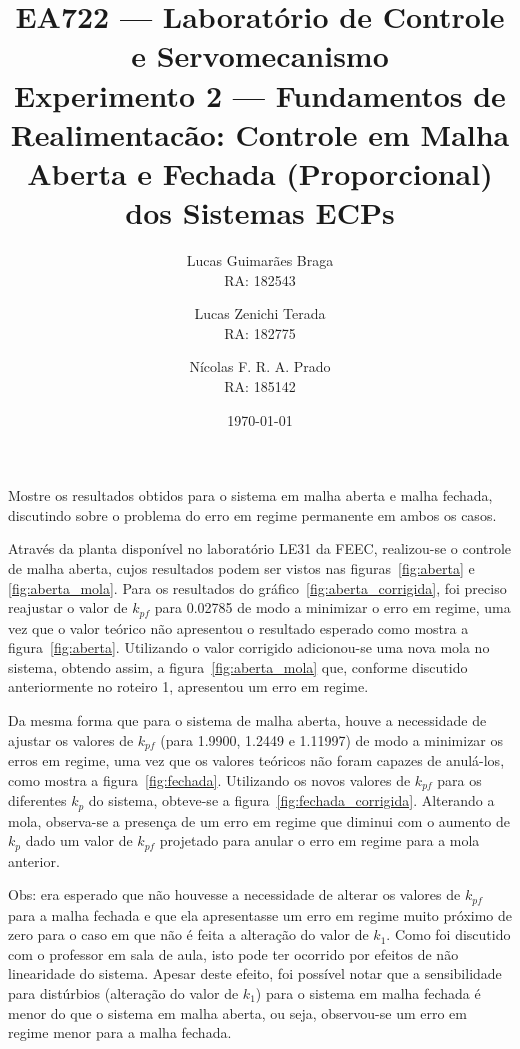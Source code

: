 \documentclass{ZenTera}
\title{\textbf{EA722 --- Laboratório de Controle e Servomecanismo\vspace{7mm}\\\large Experimento 2 --- Fundamentos de Realimentacão: Controle em Malha Aberta e Fechada (Proporcional) dos Sistemas ECPs} }
\author{Lucas Guimarães Braga \\RA: 182543 \and Lucas Zenichi Terada \\RA: 182775 \and Nícolas F. R. A. Prado \\RA: 185142}
\date{\today}
\begin{document}
%
\maketitle 

\begin{questions}
\question Mostre os resultados obtidos para o sistema em malha aberta e malha fechada, discutindo sobre o problema do erro em regime permanente em ambos os casos.

    \begin{solution}
        Através da planta disponível no laboratório LE31 da FEEC, realizou-se o controle de malha aberta, cujos resultados podem ser vistos nas figuras~\ref{fig:aberta} e \ref{fig:aberta_mola}. 
        Para os resultados do gráfico~\ref{fig:aberta_corrigida}, foi preciso reajustar o valor de $k_{pf}$ para 0.02785 de modo a minimizar o erro em regime, uma vez que o valor teórico não apresentou o resultado esperado como mostra a figura~\ref{fig:aberta}. 
        Utilizando o valor corrigido adicionou-se uma nova mola no sistema, obtendo assim, a figura~\ref{fig:aberta_mola} que, conforme discutido anteriormente no roteiro 1, apresentou um erro em regime.
        
        Da mesma forma que para o sistema de malha aberta, houve a necessidade de ajustar os valores de $k_{pf}$ (para 1.9900, 1.2449 e 1.11997) de modo a minimizar os erros em regime, uma vez que os valores teóricos não foram capazes de anulá-los, como mostra a figura~\ref{fig:fechada}.
        Utilizando os novos valores de $k_{pf}$ para os diferentes $k_p$ do sistema, obteve-se a figura~\ref{fig:fechada_corrigida}.
        Alterando a mola, observa-se a presença de um erro em regime que diminui com o aumento de $k_p$ dado um valor de $k_{pf}$ projetado para anular o erro em regime para a mola anterior.
        
        Obs: era esperado que não houvesse a necessidade de alterar os valores de $k_{pf}$ para a malha fechada e que ela apresentasse um erro em regime muito próximo de zero para o caso em que não é feita a alteração do valor de $k_1$.
        Como foi discutido com o professor em sala de aula, isto pode ter ocorrido por efeitos de não linearidade do sistema.
        Apesar deste efeito, foi possível notar que a sensibilidade para distúrbios (alteração do valor de $k_1$) para o sistema em malha fechada é menor do que o sistema em malha aberta, ou seja, observou-se um erro em regime menor para a malha fechada. 
    \end{solution}


\end{questions}
\end{document}
